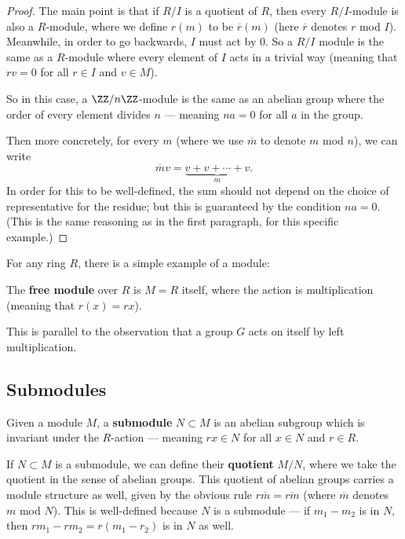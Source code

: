 \begin{proof}
    The main point is that if $R/I$ is a quotient of $R$, then every $R/I$-module is also a $R$-module, where we define $r(m)$ to be $\overline{r}(m)$ (here $\overline{r}$ denotes $r$ mod $I$). Meanwhile, in order to go backwards, $I$ must act by $0$. So a $R/I$ module is the same as a $R$-module where every element of $I$ acts in a trivial way (meaning that $rv = 0$ for all $r \in I$ and $v \in M$). 

    So in this case, a $\ZZ/n\ZZ$-module is the same as an abelian group where the order of every element divides $n$ --- meaning $na = 0$ for all $a$ in the group. 

    Then more concretely, for every $m$ (where we use $\overline{m}$ to denote $m$ mod $n$), we can write \[\overline{m}v = \underbrace{v + v + \cdots + v}_m.\] In order for this to be well-defined, the sum should not depend on the choice of representative for the residue; but this is guaranteed by the condition $na = 0$. (This is the same reasoning as in the first paragraph, for this specific example.)
\end{proof}

For any ring $R$, there is a simple example of a module:

\begin{definition}
The \textbf{free module} over $R$ is $M = R$ itself, where the action is multiplication (meaning that $r(x) = rx$).
\end{definition} 

This is parallel to the observation that a group $G$ acts on itself by left multiplication. 

\subsection{Submodules}

\vspace{0.75em}

\begin{definition}
    Given a module $M$, a \textbf{submodule} $N \subset M$ is an abelian subgroup which is invariant under the $R$-action --- meaning $rx \in N$ for all $x \in N$ and $r \in R$. 
\end{definition}

If $N \subset M$ is a submodule, we can define their \textbf{quotient} $M/N$, where we take the quotient in the sense of abelian groups. This quotient of abelian groups carries a module structure as well, given by the obvious rule $r\overline{m} = \overline{rm}$ (where $\overline{m}$ denotes $m$ mod $N$). This is well-defined because $N$ is a submodule --- if $m_1 - m_2$ is in $N$, then $rm_1 - rm_2 = r(m_1 - r_2)$ is in $N$ as well.

